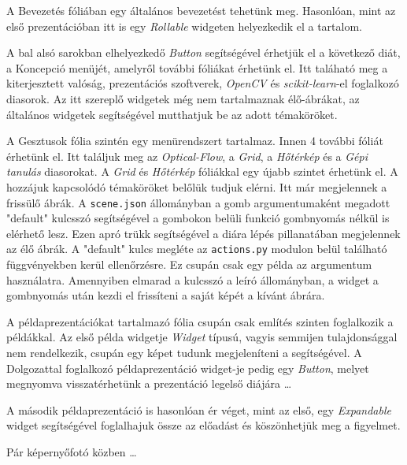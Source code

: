 A Bevezetés fóliában egy általános bevezetést tehetünk meg. Hasonlóan, mint az első prezentációban itt is egy \textit{Rollable} widgeten helyezkedik el a tartalom.

A bal alsó sarokban elhelyezkedő \textit{Button} segítségével érhetjük el a következő diát, a Koncepció menüjét, amelyről további fóliákat érhetünk el. Itt taláható meg a kiterjesztett valóság, prezentációs szoftverek, \textit{OpenCV} és \textit{scikit-learn}-el foglalkozó diasorok. Az itt szereplő widgetek még nem tartalmaznak élő-ábrákat, az általános widgetek segítségével mutthatjuk be az adott témaköröket.

A Gesztusok fólia szintén egy menürendszert tartalmaz. Innen 4 további fóliát érhetünk el.
Itt találjuk meg az \textit{Optical-Flow}, a \textit{Grid}, a \textit{Hőtérkép} és a \textit{Gépi tanulás} diasorokat. A \textit{Grid} és \textit{Hőtérkép} fóliákkal egy újabb szintet érhetünk el. A hozzájuk kapcsolódó témaköröket belőlük tudjuk elérni. Itt már megjelennek a frissülő ábrák.
A \texttt{scene.json} állományban a gomb argumentumaként megadott "default" kulcsszó segítségével a gombokon belüli funkció gombnyomás nélkül is elérhető lesz. Ezen apró trükk segítségével a diára lépés pillanatában megjelennek az élő ábrák. A "default" kulcs megléte az \texttt{actions.py} modulon belül található függvényekben kerül ellenőrzésre. Ez csupán csak egy példa az argumentum használatra. Amennyiben elmarad a kulcsszó a leíró állományban, a widget a gombnyomás után kezdi el frissíteni a saját képét a kívánt ábrára.
	
A példaprezentációkat tartalmazó fólia csupán csak említés szinten foglalkozik a példákkal. Az első példa widgetje \textit{Widget} típusú, vagyis semmijen tulajdonsággal nem rendelkezik, csupán egy képet tudunk megjeleníteni a segítségével. A Dolgozattal foglalkozó példaprezentáció widget-je pedig egy \textit{Button}, melyet megnyomva visszatérhetünk a prezentáció legelső diájára \ldots

A második példaprezentáció is hasonlóan ér véget, mint az első, egy \textit{Expandable} widget segítségével foglalhajuk össze az előadást és köszönhetjük meg a figyelmet.

Pár képernyőfotó közben \ldots